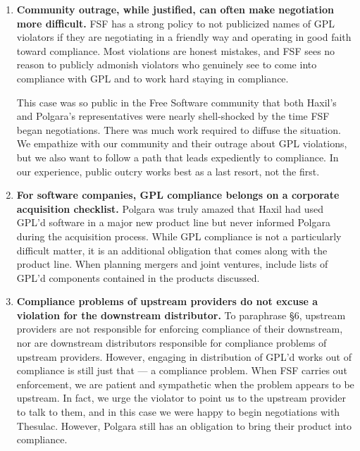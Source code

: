 \documentclass[12pt]{report}
\begin{document}
\begin{enumerate}

\item {\bf Community outrage, while justified, can often make negotiation
  more difficult.}  FSF has a strong policy to not publicized names of GPL
  violators if they are negotiating in a friendly way and operating in
  good faith toward compliance.  Most violations are honest mistakes, and
  FSF sees no reason to publicly admonish violators who genuinely see to
  come into compliance with GPL and to work hard staying in compliance.

  This case was so public in the Free Software community that both Haxil's
  and Polgara's representatives were nearly shell-shocked by the time FSF
  began negotiations.  There was much work required to diffuse the
  situation.  We empathize with our community and their outrage about GPL
  violations, but we also want to follow a path that leads expediently
  to compliance.  In our experience, public outcry works best as a last
  resort, not the first.

\item {\bf For software companies, GPL compliance belongs on a corporate
  acquisition checklist. }  Polgara was truly amazed that Haxil had used
  GPL'd software in a major new product line but never informed Polgara
  during the acquisition process.  While GPL compliance is not a
  particularly difficult matter, it is an additional obligation that comes
  along with the product line.  When planning mergers and joint ventures,
  include lists of GPL'd components contained in the products discussed.

\item {\bf Compliance problems of upstream providers do not excuse a
  violation for the downstream distributor.}  To paraphrase \S 6, upstream
  providers are not responsible for enforcing compliance of their
  downstream, nor are downstream distributors responsible for compliance
  problems of upstream providers.  However, engaging in distribution of
  GPL'd works out of compliance is still just that --- a compliance
  problem.  When FSF carries out enforcement, we are patient and
  sympathetic when the problem appears to be upstream.  In fact, we urge
  the violator to point us to the upstream provider to talk to them, and
  in this case we were happy to begin negotiations with Thesulac.  However,
  Polgara still has an obligation to bring their product into compliance.


\end{enumerate}
\end{document}
